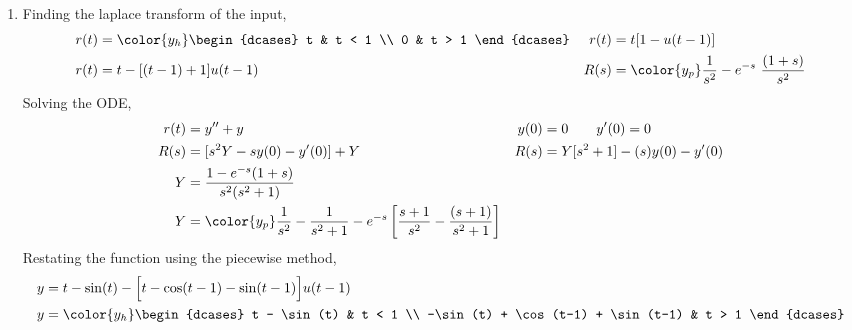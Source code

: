\begin{enumerate}
    \item Finding the laplace transform of the input,
          \begin{align}
              r(t)           & = \color{y_h}
              \begin{dcases}
                  t & t < 1 \\
                  0 & t > 1
              \end{dcases} &
              r(t)           & = t[1 - u(t-1)]                        \\
              r(t)           & = t - [(t-1) + 1]u(t-1)              &
              R(s)           & = \color{y_p} \frac{1}{s^2} - e^{-s}
              \ \frac{(1 + s)}{s^2}
          \end{align}
          Solving the ODE,
          \begin{align}
              r(t) & = y'' + y                                       &
              y(0) & = 0 \qquad y'(0) = 0                              \\
              R(s) & = [s^2Y - sy(0) - y'(0)] + Y                    &
              R(s) & = Y[s^2 + 1] - (s)y(0) - y'(0)                    \\
              Y    & = \frac{1 - e^{-s}(1 + s)}{s^2(s^2 + 1)}          \\
              Y    & = \color{y_p} \frac{1}{s^2} - \frac{1}{s^2 + 1}
              -e^{-s}\left[ \frac{s+1}{s^2} - \frac{(s+1)}{s^2 + 1} \right]
          \end{align}
          Restating the function using the piecewise method,
          \begin{align}
              y & = t - \sin(t) - \Big[ t - \cos(t-1) - \sin(t-1) \Big]u(t-1) \\
              y & = \color{y_h}
              \begin{dcases}
                  t - \sin(t)                      & t < 1 \\
                  -\sin(t) + \cos(t-1) + \sin(t-1) & t > 1
              \end{dcases}
          \end{align}


\end{enumerate}
